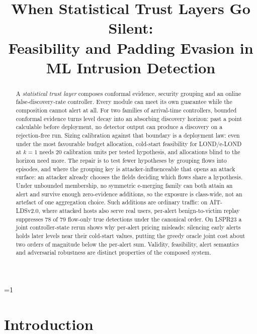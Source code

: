\documentclass[conference]{IEEEtran}
\newcommand{\satmlanon}{1}
\begin{document}
\title{When Statistical Trust Layers Go Silent:\\Feasibility and Padding Evasion in ML Intrusion Detection}

\ifnum\satmlanon=1
  \author{}
\else
  \author{}
\fi

\maketitle

\begin{abstract}
A \emph{statistical trust layer} composes conformal evidence, security grouping and an online
false-discovery-rate controller. Every module can meet its own guarantee while the composition cannot
alert at all. For two families of arrival-time controllers, bounded conformal evidence turns level
decay into an absorbing discovery horizon: past a point calculable before deployment, no detector
output can produce a discovery on a rejection-free run. Sizing calibration against that boundary is a
deployment law:
even under the most favourable budget allocation, cold-start feasibility for LOND/e-LOND at $k=1$
needs $20$ calibration units per tested hypothesis, and allocations blind to the horizon need more. The repair is to test fewer
hypotheses by grouping flows into episodes, and where the grouping key is attacker-influenceable that
opens an attack surface: an attacker already chooses the fields deciding which flows share a
hypothesis. Under unbounded membership, no symmetric e-merging family can both attain an alert and
survive enough zero-evidence additions, so the exposure is class-wide, not an artefact of one
aggregation choice. Such additions are ordinary traffic: on AIT-LDSv2.0, where attacked hosts also
serve real users, per-alert benign-to-victim replay suppresses 78 of 79 flow-only true detections under the
canonical order. On LSPR23 a joint controller-state rerun shows why per-alert pricing misleads:
silencing early alerts holds later levels near their cold-start values, putting the greedy oracle joint
cost about two orders of magnitude below the per-alert sum. Validity, feasibility, alert semantics and
adversarial robustness are distinct properties of the composed system.
\end{abstract}

\section{Introduction}\label{sec:intro}
\end{document}
